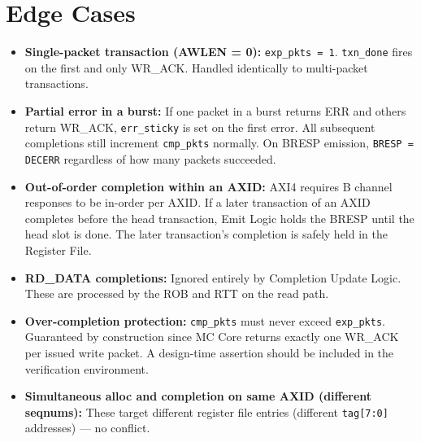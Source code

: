 \documentclass[11pt,a4paper]{article}
\begin{document}
\section{Edge Cases}

\begin{itemize}
  \item \textbf{Single-packet transaction (AWLEN = 0):}
        \texttt{exp\_pkts = 1}. \texttt{txn\_done} fires on the first
        and only WR\_ACK. Handled identically to multi-packet
        transactions.
  \item \textbf{Partial error in a burst:} If one packet in a burst
        returns ERR and others return WR\_ACK, \texttt{err\_sticky} is
        set on the first error. All subsequent completions still
        increment \texttt{cmp\_pkts} normally. On BRESP emission,
        \texttt{BRESP = DECERR} regardless of how many packets
        succeeded.
  \item \textbf{Out-of-order completion within an AXID:} AXI4 requires
        B channel responses to be in-order per AXID. If a later
        transaction of an AXID completes before the head transaction,
        Emit Logic holds the BRESP until the head slot is done. The
        later transaction's completion is safely held in the Register
        File.
  \item \textbf{RD\_DATA completions:} Ignored entirely by Completion
        Update Logic. These are processed by the ROB and RTT on the
        read path.
  \item \textbf{Over-completion protection:} \texttt{cmp\_pkts} must
        never exceed \texttt{exp\_pkts}. Guaranteed by construction
        since MC Core returns exactly one WR\_ACK per issued write
        packet. A design-time assertion should be included in the
        verification environment.
  \item \textbf{Simultaneous alloc and completion on same AXID
        (different seqnums):} These target different register file
        entries (different \texttt{tag[7:0]} addresses) — no conflict.
\end{itemize}
\end{document}

